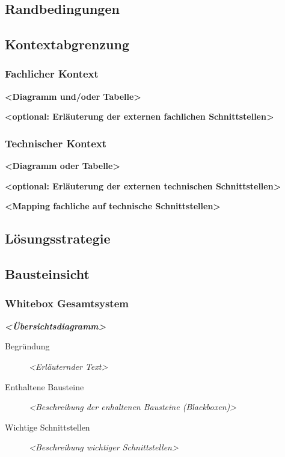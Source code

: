 \subsection{Randbedingungen}\label{section-architecture-constraints}

\subsection{Kontextabgrenzung}\label{section-system-scope-and-context}

\subsubsection{Fachlicher Kontext}\label{_fachlicher_kontext}

\textbf{\textless{}Diagramm und/oder Tabelle\textgreater{}}

\textbf{\textless{}optional: Erläuterung der externen fachlichen
Schnittstellen\textgreater{}}

\subsubsection{Technischer Kontext}\label{_technischer_kontext}

\textbf{\textless{}Diagramm oder Tabelle\textgreater{}}

\textbf{\textless{}optional: Erläuterung der externen technischen
Schnittstellen\textgreater{}}

\textbf{\textless{}Mapping fachliche auf technische
Schnittstellen\textgreater{}}

\subsection{Lösungsstrategie}\label{section-solution-strategy}

\subsection{Bausteinsicht}\label{section-building-block-view}

\subsubsection{Whitebox Gesamtsystem}\label{_whitebox_gesamtsystem}

\emph{\textbf{\textless{}Übersichtsdiagramm\textgreater{}}}

\begin{description}
\item[Begründung]
\emph{\textless{}Erläuternder Text\textgreater{}}
\item[Enthaltene Bausteine]
\emph{\textless{}Beschreibung der enhaltenen Bausteine
(Blackboxen)\textgreater{}}
\item[Wichtige Schnittstellen]
\emph{\textless{}Beschreibung wichtiger Schnittstellen\textgreater{}}
\end{description}

